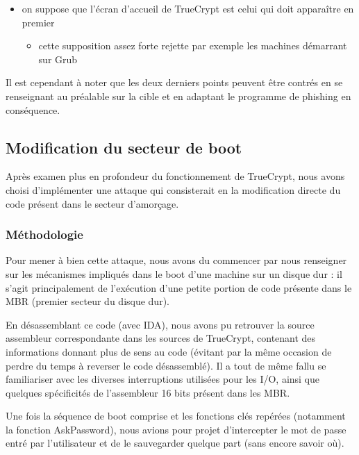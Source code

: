 \documentclass[12pt,a4paper]{article}
\begin{document}
{\begin{itemize}
\begin{itemize}
	\end{itemize}
	\item on suppose que l'écran d’accueil de TrueCrypt est celui qui doit apparaître en premier
	\begin{itemize}
		\item cette supposition assez forte rejette par exemple les machines démarrant sur Grub
	\end{itemize}
\end{itemize}
}

Il est cependant à noter que les deux derniers points peuvent être contrés en
se renseignant au préalable sur la cible et en adaptant le programme de
phishing en conséquence.


\subsection{Modification du secteur de boot}

Après examen plus en profondeur du fonctionnement de TrueCrypt, nous avons
choisi d'implémenter une attaque qui consisterait en la modification directe du
code présent dans le secteur d'amorçage.

\subsubsection{Méthodologie}

Pour mener à bien cette attaque, nous avons du commencer par nous renseigner
sur les mécanismes impliqués dans le boot d'une machine sur un disque dur : il
s'agit principalement de l'exécution d'une petite portion de code présente dans le
MBR (premier secteur du disque dur).

En désassemblant ce code (avec IDA), nous avons pu retrouver la source
assembleur correspondante dans les sources de TrueCrypt, contenant des
informations donnant plus de sens au code (évitant par la même occasion de perdre du
temps à reverser le code désassemblé). Il a tout de même fallu se familiariser
avec les diverses interruptions utilisées pour les I/O, ainsi que quelques
spécificités de l'assembleur 16 bits présent dans les MBR.

Une fois la séquence de boot comprise et les fonctions clés repérées (notamment
la fonction AskPassword), nous avions pour projet d'intercepter le mot de passe
entré par l'utilisateur et de le sauvegarder quelque part (sans encore savoir
où).
\end{document}
